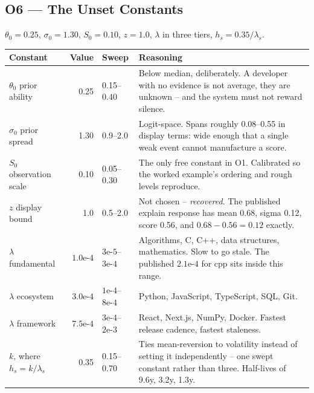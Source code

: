 \documentclass[10pt,a4paper]{article}
\newenvironment{decidedbox}[1]{%
  \def\FrameCommand{{\color{accent}\vrule width 2.4pt}\hspace{9pt}}%
  \MakeFramed{\advance\hsize-\width \FrameRestore}%
  \noindent{\sffamily\footnotesize\bfseries\color{accent}DECIDED --- #1}\par\smallskip
  \small
}{%
  \par\endMakeFramed
}
\begin{document}
\subsection{O6 --- The Unset Constants}
\label{sec:o6}

\begin{decidedbox}{}
$\theta_0=0.25$, $\sigma_0=1.30$, $S_0=0.10$, $z=1.0$, $\lambda$ in three
tiers, $h_s = 0.35/\lambda_s$.
\end{decidedbox}

\begin{center}
\small
\begin{tabular}{@{}L{2.9cm}rL{2.0cm}L{7.2cm}@{}}
\toprule
\textbf{Constant} & \textbf{Value} & \textbf{Sweep} & \textbf{Reasoning} \\
\midrule
$\theta_0$ prior ability & 0.25 & 0.15--0.40 & Below median, deliberately. A developer with no evidence is not average, they are unknown -- and the system must not reward silence. \\
$\sigma_0$ prior spread  & 1.30 & 0.9--2.0  & Logit-space. Spans roughly 0.08--0.55 in display terms: wide enough that a single weak event cannot manufacture a score. \\
$S_0$ observation scale  & 0.10 & 0.05--0.30 & The only free constant in O1. Calibrated so the worked example's ordering and rough levels reproduce. \\
$z$ display bound        & 1.0  & 0.5--2.0  & Not chosen -- \emph{recovered}. The published explain response has mean 0.68, sigma 0.12, score 0.56, and $0.68-0.56=0.12$ exactly. \\
$\lambda$ fundamental    & $1.0\text{e-}4$ & $3\text{e-}5$--$3\text{e-}4$ & Algorithms, C, C++, data structures, mathematics. Slow to go stale. The published $2.1\text{e-}4$ for cpp sits inside this range. \\
$\lambda$ ecosystem      & $3.0\text{e-}4$ & $1\text{e-}4$--$8\text{e-}4$ & Python, JavaScript, TypeScript, SQL, Git. \\
$\lambda$ framework      & $7.5\text{e-}4$ & $3\text{e-}4$--$2\text{e-}3$ & React, Next.js, NumPy, Docker. Fastest release cadence, fastest staleness. \\
$k$, where $h_s=k/\lambda_s$ & 0.35 & 0.15--0.70 & Ties mean-reversion to volatility instead of setting it independently -- one swept constant rather than three. Half-lives of 9.6y, 3.2y, 1.3y. \\
\bottomrule
\end{tabular}
\end{center}
\end{document}

